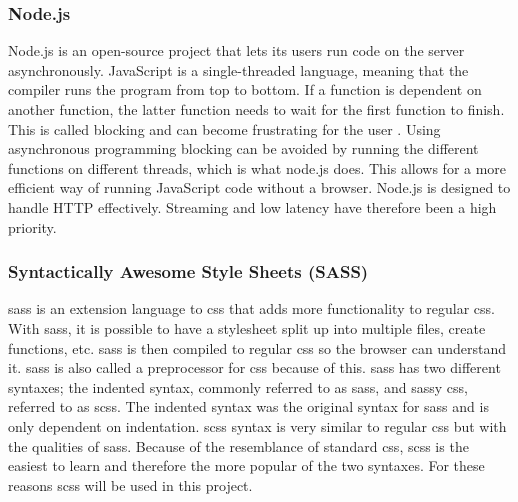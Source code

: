 


\subsubsection{Node.js}%
\label{ssub:Node}
Node.js is an open-source project that lets its users run code on the server asynchronously\cite{node.js}. JavaScript is a single-threaded language, meaning that the compiler runs the program from top to bottom. If a function is dependent on another function, the latter function needs to wait for the first function to finish. This is called blocking and can become frustrating for the user \cite{GeneralAsynchronousProgramming}. Using asynchronous programming blocking can be avoided by running the different functions on different threads, which is what node.js does. This allows for a more efficient way of running JavaScript code without a browser. Node.js is designed to handle HTTP effectively. Streaming and low latency have therefore been a high priority. 


\subsubsection{Syntactically Awesome Style Sheets (SASS)}%
\label{sub:sass}
\acrfull{sass} is an extension language to \acrshort{css} that adds more functionality to regular \acrshort{css}. With \acrshort{sass}, it is possible to have a stylesheet split up into multiple files, create functions, etc. \acrshort{sass} is then compiled to regular \acrshort{css} so the browser can understand it. \acrshort{sass} is also called a preprocessor for \acrshort{css} because of this. \acrshort{sass} has two different syntaxes; the indented syntax, commonly referred to as \acrshort{sass}, and sassy \acrshort{css}, referred to as \acrshort{scss}. The indented syntax was the original syntax for \acrshort{sass} and is only dependent on indentation. \acrshort{scss} syntax is very similar to regular \acrshort{css} but with the qualities of \acrshort{sass}. Because of the resemblance of standard \acrshort{css}, \acrshort{scss} is the easiest to learn and therefore the more popular of the two syntaxes. For these reasons \acrshort{scss} will be used in this project.

